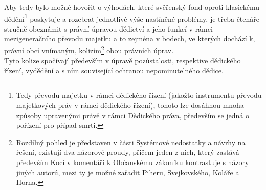 \documentclass{article}
\begin{document}
Aby tedy bylo možné hovořit o výhodách, které svěřenský fond oproti klasickému dědění\footnote{Tedy převodu majetku v rámci dědického řízení (jakožto instrumentu převodu majetkových práv v rámci dědického řízení), tohoto lze dosáhnou mnoha způsoby upravenými právě v rámci Dědického práva, především se jedná o pořízení pro případ smrti.} poskytuje a rozebrat jednotlivé výše nastíněné problémy, je třeba čtenáře stručně obeznámit s právní úpravou dědictví a jeho funkcí v rámci mezigeneračního převodu majetku a to zejména v bodech, ve kterých dochází k, právní obcí vnímaným, kolizím\footnote{Rozdílný pohled je představen v části Systémové nedostatky a návrhy na řešení, existují dva názorové proudy, přičem jeden z nich, který zastává především Kocí v komentáři k Občanskému zákoníku kontrastuje s názory jiných autorú, mezi ty je možné zařadit Piheru, Svejkovského, Koláře a Horna.} obou právních úprav.\\


Tyto kolize spočívají především v úpravě pozůstalosti, respektive dědického řízení, vydědění a s ním související ochranou nepominutelného dědice.\\


\end{document}
